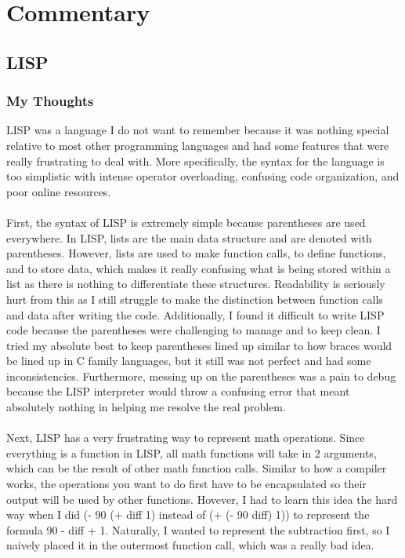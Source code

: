 \documentclass[letterpaper, 10pt, DIV=13]{scrartcl}
\numberwithin{equation}{section}
\numberwithin{figure}{section}
\numberwithin{table}{section}
\begin{document}
\section{Commentary}
\subsection{LISP}
\subsubsection{My Thoughts}
LISP was a language I do not want to remember because it was nothing special relative to most other programming languages and had some features 
that were really frustrating to deal with. More specifically, the syntax for the language is too simplistic with intense operator overloading, 
confusing code organization, and poor online resources.
\\ \\
First, the syntax of LISP is extremely simple because parentheses are used everywhere. In LISP, lists are the main data structure and are denoted with 
parentheses. However, lists are used to make function calls, to define functions, and to store data, which makes it really confusing what is being stored within a 
list as there is nothing to differentiate these structures. Readability is seriously hurt from this as I still struggle to make the distinction between function 
calls and data after writing the code. Additionally, I found it difficult to write LISP code because the parentheses were challenging to manage and to keep clean. 
I tried my absolute best to keep parentheses lined up similar to how braces would be lined up in C family languages, but it still was not perfect and had some 
inconsistencies. Furthermore, messing up on the parentheses was a pain to debug because the LISP interpreter would throw a confusing error that meant absolutely 
nothing in helping me resolve the real problem.
\\ \\
Next, LISP has a very frustrating way to represent math operations. Since everything is a function in LISP, all math functions will take in 2 arguments, which 
can be the result of other math function calls. Similar to how a compiler works, the operations you want to do first have to be encapsulated so their output 
will be used by other functions. Hovever, I had to learn this idea the hard way when I did (- 90 (+ diff 1) instead of (+ (- 90 diff) 1)) to represent the formula
90 - diff + 1. Naturally, I wanted to represent the subtraction first, so I naively placed it in the outermost function call, which was a really bad idea.
\end{document}
